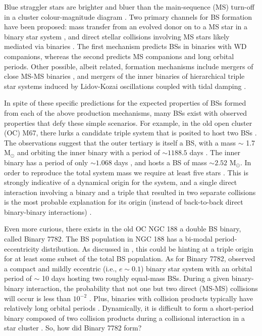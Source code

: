 \documentclass{aastex62}
\begin{document}
Blue straggler stars are brighter and bluer than the
main-sequence (MS) turn-off in a cluster colour-magnitude diagram
\citep[e.g.][]{1953AJ.....58...61S,2014ApJ...782...49S}.  Two primary
channels for BS formation have been proposed: mass transfer from an
evolved donor on to a MS star in a binary star system
\citep[e.g.][]{1964MNRAS.128..147M,1997A&A...328..143P,2009Natur.457..288K,2011MNRAS.410.2370L,2011Natur.478..356G},
and direct stellar collisions involving MS stars likely 
mediated via binaries
\citep[e.g.][]{1975AJ.....80..809H,1997A&A...328..130P,2007ApJ...661..210L,2013MNRAS.428..897L,2013MNRAS.429.1221H,2018arXiv181100058P}.
The first mechanism predicts BSs in binaries with WD companions, whereas the second predicts 
MS companions and long orbital periods.  Other possible, albeit related, formation mechanisms include mergers
of close MS-MS binaries \cite{2018arXiv181100058P},
and mergers of the inner binaries of hierarchical triple star systems
induced by Lidov-Kozai oscillations coupled with tidal damping
\citep[e.g.][]{2009ApJ...697.1048P}.

In spite of these specific predictions for the expected properties of
BSs formed from each of the above production mechanisms, many BSs
exist with observed properties that defy these simple scenarios.  For
example, in the old open cluster (OC) M67, there lurks a candidate triple
system that is posited to host two BSs
\citep{2001A&A...375..375V,2003AJ....125..810S}.  The observations
suggest that the outer tertiary is itself a BS, with a mass $\sim$ 1.7
M$_{\odot}$ and orbiting the inner binary with a period of $\sim
1188.5$ days \citep{2003AJ....125..810S}.  The inner binary has a
period of only $\sim 1.068$ days \citep{2001A&A...375..375V}, and
hosts a BS of mass $\sim 2.52$ M$_{\odot}$.  In order to reproduce the total system mass 
we require at least five stars \citep{2011MNRAS.410.2370L}.  This is strongly indicative of a
dynamical origin for the system, and a single direct interaction
involving a binary and a triple that resulted in two separate
collisions is the most probable explanation for its origin
(instead of back-to-back direct binary-binary interactions)
\citep{2004MNRAS.350..615G,2011MNRAS.410.2370L}.  

Even more curious, there exists in the old OC NGC 188 a
double BS binary, called Binary 7782.  The BS
population in NGC 188 has a bi-modal period-eccentricity distribution.
As discussed in \citet{2011MNRAS.410.2370L}, this could be hinting at
a triple origin for at least some subset of the total BS population.
As for Binary 7782, \citet{2009Natur.462.1032M} observed a compact and
mildly eccentric (i.e., $e \sim 0.1$) binary star system with an
orbital period of $\sim$ 10 days hosting two roughly equal-mass BSs.  During a given binary-binary interaction, the probability
that not one but two direct (MS-MS) collisions will occur is less than
$10^{-2}$
\citep{1989AJ.....98..217L,2011MNRAS.410.2370L,2012MNRAS.425.2369L}.
Plus, binaries with collision products typically have relatively long
orbital periods \cite{2011Sci...334.1380F}. Dynamically, it is
difficult to form a short-period binary composed of two collision
products during a collisional interaction in a star cluster
\citep{2011MNRAS.410.2370L,2011Sci...334.1380F}.  So, how did Binary 7782 form?
\end{document}
